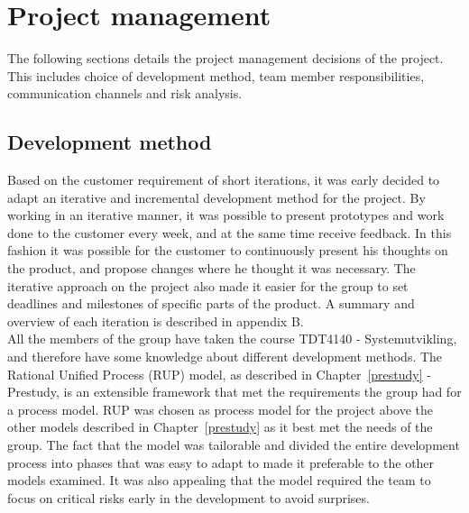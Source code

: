 \chapter{Project management}
The following sections details the project management decisions of the project. This includes choice of development method, team member responsibilities, communication channels and risk analysis.

\section{Development method}
\label{development-method}
Based on the customer requirement of short iterations, it was early decided to adapt an iterative and incremental development method for the project. By working in an iterative manner, it was possible to present prototypes and work done to the customer every week, and at the same time receive feedback. In this fashion it was possible for the customer to continuously present his thoughts on the product, and propose changes where he thought it was necessary. The iterative approach on the project also made it easier for the group to set deadlines and milestones of specific parts of the product. A summary and overview of each iteration is described in appendix B.\\
\newline
All the members of the group have taken the course TDT4140 - Systemutvikling, and therefore have some knowledge about different development methods. The Rational Unified Process (RUP) model, as described in Chapter~\ref{prestudy} - Prestudy, is an extensible framework\cite{kruchten} that met the requirements the group had for a process model. RUP was chosen as process model for the project above the other models described in Chapter~\ref{prestudy} as it best met the needs of the group. The fact that the model was tailorable and divided the entire development process into phases that was easy to adapt to made it preferable to the other models examined. It was also appealing that the model required the team to focus on critical risks early in the development to avoid surprises.


